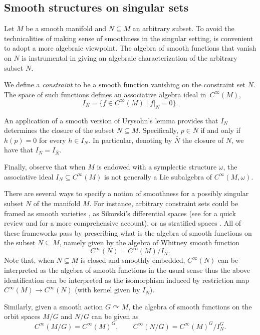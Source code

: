 \documentclass[10pt,a4paper]{amsart}
\numberwithin{equation}{section}
\DeclareMathOperator{\action}{\curvearrowright}
\renewcommand{\subset}{\subseteq}
\begin{document}
\subsection{Smooth structures on singular sets}%

Let $M$ be a smooth manifold and $N\subset M$ an arbitrary subset.
To avoid the technicalities of making sense of smoothness in the singular setting, is convenient to adopt a more algebraic viewpoint.
The algebra of smooth functions that vanish on $N$ is instrumental in giving an algebraic characterization of the arbitrary subset $N$.

\begin{Definition}\label{def:constraintideal}
	We define a \emph{constraint} to be a smooth function vanishing on the constraint set $N$.
	The space of such functions defines an associative algebra ideal in~$C^\infty(M)$,
	\[
		I_N	= 	\{
					f \in C^\infty(M)
				\mid
					f|_N = 0
			 	\}.
	\]
\end{Definition}

An application of a smooth version of Urysohn's lemma provides that $I_N$ determines the closure of the subset $N\subset M$.
Specifically, $p \in \bar{N}$ if and only if $h(p)=0$ for every $h \in I_N$.
In particular, denoting by $\bar{N}$ the closure of $N$, we have that $I_N=I_{\bar N}$.

Finally, observe that when $M$ is endowed with a symplectic structure $\omega$, the associative ideal $I_N\subset C^\infty(M)$ is not generally a Lie subalgebra of $C^\infty(M,\omega)$.

\begin{Remark}\label{rem:generalizedSmootheology}
	There are several ways to specify a notion of smoothness for a possibly singular subset $N$ of the manifold $M$.
For instance, arbitrary constraint sets could be framed as smooth varieties \cite[Section~6]{ArmsCushmanGotay91}, as Sikorski's differential spaces \cite{Sikorski72,Sikorski72a} (see \cite[Section~3]{CushmanSniatycki01} for a quick review and \cite{Stacey08} for a more comprehensive account), or as stratified spaces \cite{SjamaarLerman91}.
	All of these frameworks pass by prescribing what is the algebra of smooth functions on the subset $N\subset M$, namely given by the algebra of Whitney \cite{Whitney34} smooth function
	\[
	C^\infty(N) = C^\infty(M)/I_{N} .
	\]
	Note that, when $N\subset M$ is closed and smoothly embedded, $C^\infty(N)$ can be interpreted as the algebra of smooth functions in the usual sense thus the above identification can be interpreted as the isomorphism induced by restriction map $C^\infty(M)\to C^\infty(N)$ (with kernel given by $I_N$).
	
	Similarly, given a smooth action $G\action M$, the algebra of smooth functions on the orbit spaces $M/G$ and $N/G$ can be given as
\[
	 C^\infty(M/G)= C^\infty(M)^G , \qquad C^\infty(N/G)= C^\infty(M)^G / I_N^G .
\]
\end{Remark}
\end{document}

